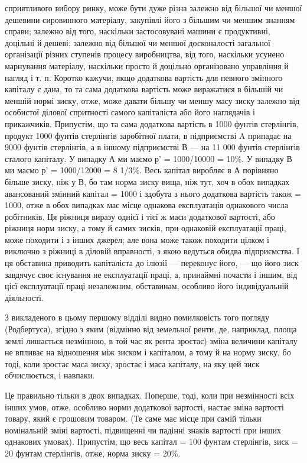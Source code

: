\parcont{}  %
сприятливого вибору ринку, може бути дуже різна залежно від
більшої чи меншої дешевини сировинного матеріалу, закупівлі
його з більшим чи меншим знанням справи; залежно від того,
наскільки застосовувані машини є продуктивні, доцільні й дешеві;
залежно від більшої чи меншої досконалості загальної
організації різних ступенів процесу виробництва, від того, наскільки
усунено марнування матеріалу, наскільки просто й доцільно
організовано управління й нагляд і т. п. Коротко кажучи,
якщо додаткова вартість для певного змінного капіталу є дана,
то та сама додаткова вартість може виражатися в більшій чи
меншій нормі зиску, отже, може давати більшу чи меншу масу
зиску залежно від особистої ділової спритності самого капіталіста
або його наглядачів і прикажчиків. Припустім, що та сама додаткова
вартість в 1000 фунтів стерлінгів, продукт 1000 фунтів
стерлінгів заробітної плати, в підприємстві A припадає на
9000 фунтів стерлінгів, а в іншому підприємстві В — на 11 000
фунтів стерлінгів сталого капіталу. У випадку А ми маємо
р' = 1000/10000 = 10\%. У випадку В ми маємо р' = 1000/12000 = 8 1/3\%.
Весь капітал виробляє в А порівняно більше зиску, ніж у В, бо
там норма зиску вища, ніж тут, хоч в обох випадках авансований
змінний капітал = 1000 і здобута з нього додаткова
вартість також = 1000, отже в обох випадках має місце однакова
експлуатація однакового числа робітників. Ця ріжниця
виразу однієї і тієї ж маси додаткової вартості, або ріжниця
норм зиску, а тому й самих зисків, при однаковій експлуатації
праці, може походити і з інших джерел; але вона може також
походити цілком і виключно з ріжниці в діловій вправності, з
якою ведуться обидва підприємства. І ця обставина приводить
капіталіста до ілюзії — переконує його, — що його зиск завдячує
своє існування не експлуатації праці, а, принаймні почасти і
іншим, від цієї експлуатації праці незалежним, обставинам, особливо
його індивідуальній діяльності.

З викладеного в цьому першому відділі видно помилковість
того погляду (Родбертуса), згідно з яким (відмінно від
земельної ренти, де, наприклад, площа землі лишається незмінною,
в той час як рента зростає) зміна величини капіталу не впливає
на відношення між зиском і капіталом, а тому й на норму
зиску, бо тоді, коли зростає маса зиску, зростає і маса капіталу,
на яку цей зиск обчислюється, і навпаки.

Це правильно тільки в двох випадках. Поперше, тоді, коли
при незмінності всіх інших умов, отже, особливо норми додаткової
вартості, настає зміна вартості товару, який є грошовим
товаром. (Те саме має місце при самій тільки номінальній
зміні вартості, підвищенні чи падінні знаків вартості при інших
однакових умовах). Припустім, що весь капітал = 100 фунтам
стерлінгів, зиск = 20 фунтам стерлінгів, отже, норма зиску = 20\%.
\parbreak{}  %
